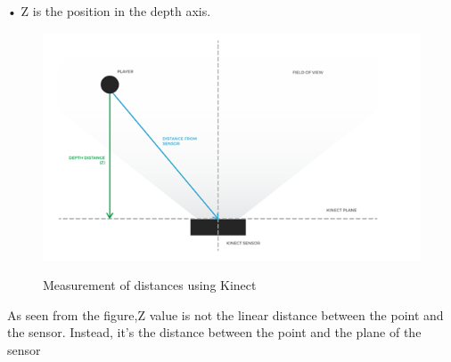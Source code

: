 •	Z is the position in the depth axis.


\begin{figure}[H]
\centering
{\includegraphics[scale=0.75]{figsensor.png}}
\caption{Measurement of distances using Kinect}
\end{figure}

\noindent As seen from the figure,Z value is not the linear distance between the point and the sensor. Instead, it’s the distance between the point and the plane of the sensor


